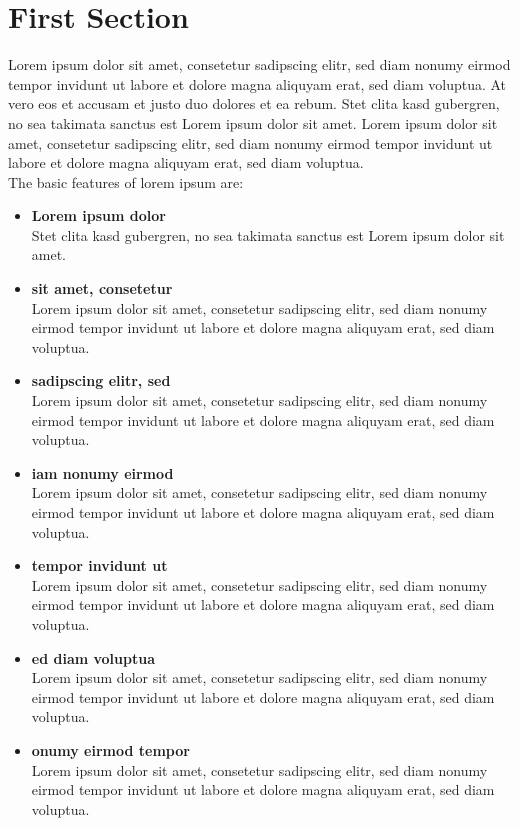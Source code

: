 \section{First Section}
Lorem ipsum dolor sit amet, consetetur sadipscing elitr, sed diam nonumy eirmod tempor invidunt ut labore et dolore
magna aliquyam erat, sed diam voluptua.
At vero eos et accusam et justo duo dolores et ea rebum.
Stet clita kasd gubergren, no sea takimata sanctus est Lorem ipsum dolor sit amet.
Lorem ipsum dolor sit amet, consetetur sadipscing elitr, sed diam nonumy eirmod tempor invidunt ut labore et dolore
magna aliquyam erat, sed diam voluptua.
\\[0.75cm]
The basic features of lorem ipsum are:
\begin{itemize}
    \item \textbf{Lorem ipsum dolor} \\
    Stet clita kasd gubergren, no sea takimata sanctus est Lorem ipsum dolor sit amet.

    \item \textbf{sit amet, consetetur} \\
    Lorem ipsum dolor sit amet, consetetur sadipscing elitr, sed diam nonumy eirmod tempor invidunt ut labore et dolore
    magna aliquyam erat, sed diam voluptua.

    \item \textbf{sadipscing elitr, sed} \\
    Lorem ipsum dolor sit amet, consetetur sadipscing elitr, sed diam nonumy eirmod tempor invidunt ut labore et dolore
    magna aliquyam erat, sed diam voluptua.

    \item \textbf{iam nonumy eirmod} \\
    Lorem ipsum dolor sit amet, consetetur sadipscing elitr, sed diam nonumy eirmod tempor invidunt ut labore et dolore
    magna aliquyam erat, sed diam voluptua.

    \item \textbf{tempor invidunt ut} \\
    Lorem ipsum dolor sit amet, consetetur sadipscing elitr, sed diam nonumy eirmod tempor invidunt ut labore et dolore
    magna aliquyam erat, sed diam voluptua.

    \item \textbf{ed diam voluptua} \\
    Lorem ipsum dolor sit amet, consetetur sadipscing elitr, sed diam nonumy eirmod tempor invidunt ut labore et dolore
    magna aliquyam erat, sed diam voluptua.

    \item \textbf{onumy eirmod tempor} \\
    Lorem ipsum dolor sit amet, consetetur sadipscing elitr, sed diam nonumy eirmod tempor invidunt ut labore et dolore
    magna aliquyam erat, sed diam voluptua.
\end{itemize}
\cite{1}

